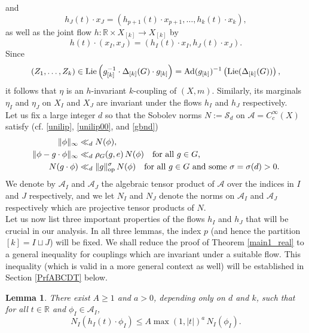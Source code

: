 \documentclass[11pt,reqno,a4paper]{amsart}
\numberwithin{equation}{section}
\newcommand{\cA}{\mathcal{A}}
\newcommand{\cS}{\mathcal{S}}
\newcommand{\bR}{\mathbb{R}}
\newcommand{\ra}{\rightarrow}
\DeclareMathOperator{\Ad}{Ad}
\theoremstyle{theorem}
\newtheorem{lemma}[theorem]{Lemma}
\theoremstyle{definition}
\begin{document}
and
\begin{equation}
\label{eq:hJ}
h_J(t) \cdot x_J = (h_{p+1}(t) \cdot x_{p+1},\ldots,h_k(t) \cdot x_k),
\end{equation}
as well as the joint flow $h : \bR \times X_{[k]} \ra X_{[k]}$ by
\[
h(t) \cdot (x_I,x_J) = (h_I(t) \cdot x_I, h_J(t) \cdot x_J).
\]
Since
$$
(Z_1,\ldots, Z_k)\in \hbox{Lie}\left(g_{[k]}^{-1} \cdot \Delta_{[k]}(G) \cdot g_{[k]}\right)
=\Ad(g_{[k]})^{-1}\left(\hbox{Lie}(\Delta_{[k]}(G))\right),
$$
it follows that $\eta$ is an $h$-invariant $k$-coupling of $(X,m)$.
Similarly, its marginals $\eta_I$ and $\eta_J$ on $X_I$ and $X_J$ are invariant under 
the flows $h_I$ and $h_J$ respectively. \\

Let us fix a large integer $d$ so that the Sobolev norms $N := \cS_{d}$ on $\cA=C_c^\infty(X)$ satisfy (cf. \eqref{unilip}, \eqref{unilip00}, and \eqref{gbnd})
\begin{align}
\|\phi\|_\infty &\ll_d  N(\phi), \label{eq:n1_0} \\
\|\phi-g\cdot \phi\|_\infty &\ll_{d} \rho_G(g,e) \, N(\phi)\quad \hbox{for all $g \in G$,} \label{eq:n2_0}\\
N(g \cdot \phi) &\ll_{d} \|g\|_{\rm op}^{\sigma}\, N(\phi)\quad\hbox{for all $g\in G$ and some $\sigma =\sigma(d)> 0$}.\label{eq:n3_0}
\end{align}
We denote by $\cA_I$ and $\cA_J$ the algebraic tensor product of $\cA$ over the indices
in $I$ and $J$ respectively, and we let $N_I$ and $N_J$ denote the norms on $\cA_I$ and $\cA_J$ respectively which are 
projective tensor products of $N$. \\

Let us now list three important properties of the flows $h_I$ and $h_J$ that will be crucial in our analysis. In
all three lemmas, the index $p$ (and hence the partition $[k] = I \sqcup J$) will be fixed. We shall reduce the
proof of Theorem \ref{main1_real} to a general inequality for couplings which are invariant under a suitable
flow. This inequality (which is valid in a more general context as well) will be established in Section 
\ref{PrfABCDT} below. 

\begin{lemma}
\label{lemma1}
There exist $A \geq 1$ and $a > 0$,
depending only on $d$ and $k$, such that for all $t \in \mathbb{R}$ and $\phi_I \in \cA_I$,
$$
N_I(h_I(t) \cdot \phi_I) \leq A \max(1,|t|)^a \, N_I(\phi_I).
$$
\end{lemma}
\end{document}
